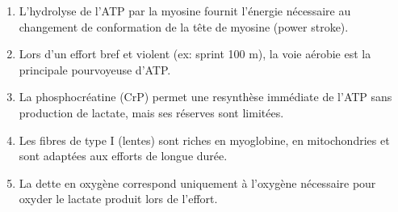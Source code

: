 \documentclass[11pt]{article}
\begin{document}
\begin{exercice}
\begin{enumerate}
    \item L'hydrolyse de l'ATP par la myosine fournit l'énergie nécessaire au changement de conformation de la tête de myosine (power stroke).
    \item Lors d'un effort bref et violent (ex: sprint 100 m), la voie aérobie est la principale pourvoyeuse d'ATP.
    \item La phosphocréatine (CrP) permet une resynthèse immédiate de l'ATP sans production de lactate, mais ses réserves sont limitées.
    \item Les fibres de type I (lentes) sont riches en myoglobine, en mitochondries et sont adaptées aux efforts de longue durée.
    \item La dette en oxygène correspond uniquement à l'oxygène nécessaire pour oxyder le lactate produit lors de l'effort.
\end{enumerate}
\end{exercice}
\end{document}
